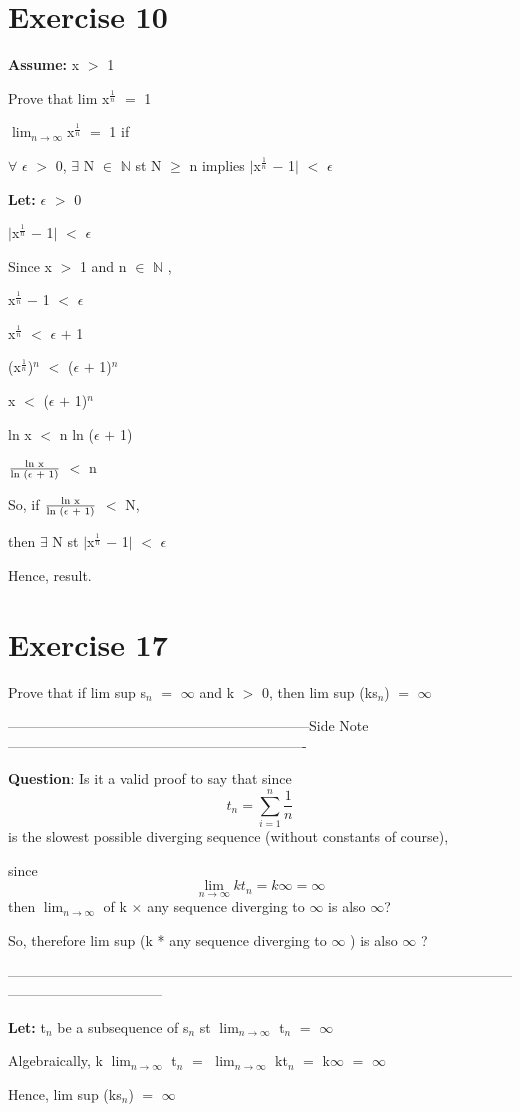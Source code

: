 \documentclass{article}
\newcommand{\mt}[1]{\ensuremath{#1}}
\newcommand\bsc[2][\DefaultOpt]{%
  \def\DefaultOpt{#2}%
  \section[#1]{#2}%
}
\newcommand{\lt}[1]{\textbf{Let: } #1}
\newcommand{\as}[1]{\textbf{Assume: } #1}
\newcommand{\sidenote}[1]{-----------------------------------------------------------------Side Note----------------------------------------------------------------
#1 \

---------------------------------------------------------------------------------------------------------------------------------------------}
\newcommand{\bn}{\mt{\mathbb{N}} }       %
\newcommand{\ep}{\mt{\epsilon} }         %
\newcommand{\fa}{\mt{\forall} }          %
\newcommand{\mem}{\mt{\in} }
\newcommand{\exs}{\mt{\exists} }
\newcommand{\av}[1]{\mt{|}#1\mt{|}}  %
\newcommand{\ps}{\mt{+} }
\newcommand{\ms}{\mt{-} }
\newcommand{\ls}{\mt{<} }
\newcommand{\gr}{\mt{>} }
\newcommand{\gre}{\mt{\geq} }
\newcommand{\eql}{\mt{=} }
\newcommand{\uw}[2]{#1\mt{_{#2}}}
\newcommand{\uf}[2]{#1\mt{^{#2}}}
\newcommand{\frc}[2]{\mt{\frac{#1}{#2}}}
\newcommand{\lmti}[1]{\mt{\displaystyle{\lim_{#1 \to \infty}}}}
\newcommand{\eqn}[1]{\[#1\]}
\newcommand{\infy}{\mt{\infty} }
\begin{document}
\bsc{Exercise 10}{

\as{x \gr 1}

Prove that lim \uf{x}{\frc{1}{n}} \eql 1

\lmti{n}\uf{x}{\frc{1}{n}} \eql 1 if

\fa \ep \gr 0, \exs N \mem \bn st N \gre n implies \av{\uf{x}{\frc{1}{n}} \ms 1} \ls \ep

\lt{\ep \gr 0}

\av{\uf{x}{\frc{1}{n}} \ms 1} \ls \ep

Since x \gr 1 and n \mem \bn,

\uf{x}{\frc{1}{n}} \ms 1 \ls \ep

\uf{x}{\frc{1}{n}} \ls \ep \ps 1

(\uf{x}{\frc{1}{n}})$^n$ \ls (\ep \ps 1)$^n$

x \ls (\ep \ps 1)$^n$

ln x \ls n ln (\ep \ps 1)

\frc{\textrm{ln x}}{\textrm{ln (\ep + 1)}} \ls n

So, if \frc{\textrm{ln x}}{\textrm{ln (\ep + 1)}} \ls N,

then \exs N st \av{\uf{x}{\frc{1}{n}} \ms 1} \ls \ep

Hence, result.
}

\bsc{Exercise 17}{

Prove that if lim sup \uw{s}{n} \eql \infy and k \gr 0, then lim sup (k\uw{s}{n}) \eql \infy

\sidenote{
\textbf{Question}: Is it a valid proof to say that since
\eqn{t_n = \sum_{i = 1}^n \frac{1}{n}}
is the slowest possible diverging sequence (without constants of course),

since
\eqn{\lmti{n} kt_n = k \infty = \infty}
then \lmti{n} of k $\times$ any sequence diverging to \infy is also $\infty$?

So, therefore lim sup (k * any sequence diverging to \infy) is also \infy?
}

\lt{\uw{t}{n} be a subsequence of \uw{s}{n} st \lmti{n} \uw{t}{n} \eql \infy}

Algebraically, k \lmti{n} \uw{t}{n} \eql \lmti{n} k\uw{t}{n} \eql k\infy \eql \infy

Hence, lim sup (k\uw{s}{n}) \eql \infy


}
\end{document}
